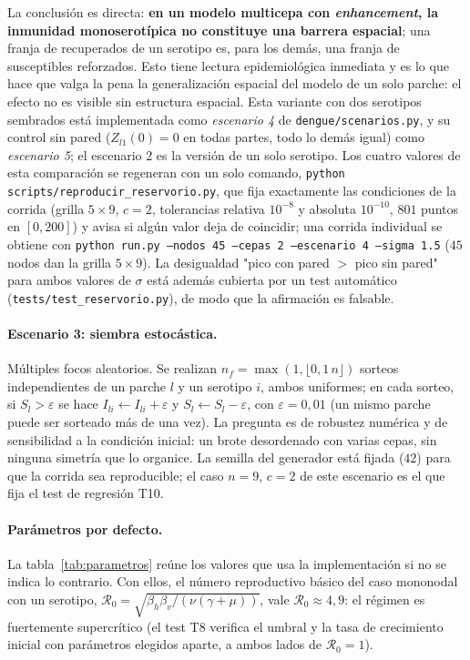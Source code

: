 \documentclass{article}
\numberwithin{equation}{section}
\begin{document}
La conclusión es directa: \textbf{en un modelo multicepa con \emph{enhancement}, la inmunidad monoserotípica no constituye una barrera espacial}; una franja de recuperados de un serotipo es, para los demás, una franja de susceptibles reforzados. Esto tiene lectura epidemiológica inmediata y es lo que hace que valga la pena la generalización espacial del modelo de un solo parche: el efecto no es visible sin estructura espacial. Esta variante con dos serotipos sembrados está implementada como \emph{escenario 4} de \texttt{dengue/scenarios.py}, y su control sin pared ($Z_{l1}(0)=0$ en todas partes, todo lo demás igual) como \emph{escenario 5}; el escenario 2 es la versión de un solo serotipo. Los cuatro valores de esta comparación se regeneran con un solo comando, \texttt{python scripts/reproducir\_reservorio.py}, que fija exactamente las condiciones de la corrida (grilla $5\times 9$, $c=2$, tolerancias relativa $10^{-8}$ y absoluta $10^{-10}$, $801$ puntos en $[0,200]$) y avisa si algún valor deja de coincidir; una corrida individual se obtiene con \texttt{python run.py --nodos 45 --cepas 2 --escenario 4 --sigma 1.5} ($45$ nodos dan la grilla $5\times9$). La desigualdad "pico con pared $>$ pico sin pared" para ambos valores de $\sigma$ está además cubierta por un test automático (\texttt{tests/test\_reservorio.py}), de modo que la afirmación es falsable.

\paragraph{Escenario 3: siembra estocástica.} Múltiples focos aleatorios. Se realizan $n_f=\max(1,\lfloor 0{,}1\,n\rfloor)$ sorteos independientes de un parche $l$ y un serotipo $i$, ambos uniformes; en cada sorteo, si $S_l>\varepsilon$ se hace $I_{li}\leftarrow I_{li}+\varepsilon$ y $S_l\leftarrow S_l-\varepsilon$, con $\varepsilon=0{,}01$ (un mismo parche puede ser sorteado más de una vez). La pregunta es de robustez numérica y de sensibilidad a la condición inicial: un brote desordenado con varias cepas, sin ninguna simetría que lo organice. La semilla del generador está fijada ($42$) para que la corrida sea reproducible; el caso $n=9$, $c=2$ de este escenario es el que fija el test de regresión T10.

\paragraph{Parámetros por defecto.} La tabla~\ref{tab:parametros} reúne los valores que usa la implementación si no se indica lo contrario. Con ellos, el número reproductivo básico del caso mononodal con un serotipo, $\mathcal R_0=\sqrt{\beta_h\beta_v/(\nu(\gamma+\mu))}$, vale $\mathcal R_0\approx 4{,}9$: el régimen es fuertemente supercrítico (el test T8 verifica el umbral y la tasa de crecimiento inicial con parámetros elegidos aparte, a ambos lados de $\mathcal R_0=1$).
\end{document}
